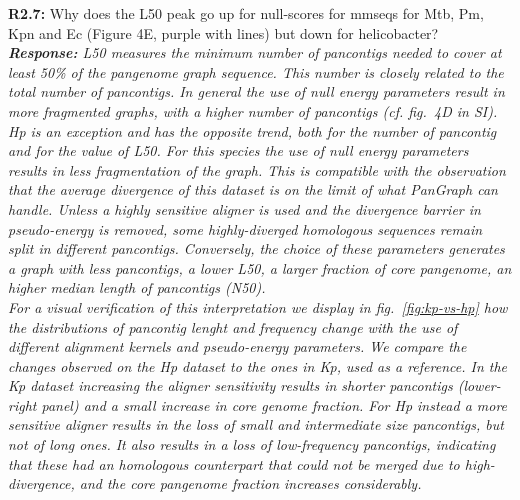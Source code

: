 \documentclass[aps,rmp,onecolumn]{revtex4-1}
\newcommand{\Marco}[1]{{\color{gray}Marco: #1}}
\newcommand{\Liam}[1]{{\color{teal}Liam: #1}}
\newcommand{\reviewer}[2]{\textbf{#1:} #2\vskip 5mm}
\newcommand{\response}[1]{{\it {\color{response}\textbf{Response:} #1}}\vskip 5mm}
\begin{document}
\reviewer{R2.7}{Why does the L50 peak go up for null-scores for mmseqs for Mtb, Pm, Kpn and Ec (Figure 4E, purple with lines) but down for helicobacter?}
\response{L50 measures the minimum number of pancontigs needed to cover at least 50\% of the pangenome graph sequence. This number is closely related to the total number of pancontigs. In general the use of null energy parameters result in more fragmented graphs, with a higher number of pancontigs (cf. fig.~4D in SI). Hp is an exception and has the opposite trend, both for the number of pancontig and for the value of L50. For this species the use of null energy parameters results in less fragmentation of the graph. This is compatible with the observation that the average divergence of this dataset is on the limit of what PanGraph can handle. Unless a highly sensitive aligner is used and the divergence barrier in pseudo-energy is removed, some highly-diverged homologous sequences remain split in different pancontigs. Conversely, the choice of these parameters generates a graph with less pancontigs, a lower L50, a larger fraction of core pangenome, an higher median length of pancontigs (N50).\\
      For a visual verification of this interpretation we display in fig.~\ref{fig:kp-vs-hp} how the distributions of pancontig lenght and frequency change with the use of different alignment kernels and pseudo-energy parameters. We compare the changes observed on the Hp dataset to the ones in Kp, used as a reference. In the Kp dataset increasing the aligner sensitivity results in shorter pancontigs (lower-right panel) and a small increase in core genome fraction. For Hp instead a more sensitive aligner results in the loss of small and intermediate size pancontigs, but not of long ones. It also results in a loss of low-frequency pancontigs, indicating that these had an homologous counterpart that could not be merged due to high-divergence, and the core pangenome fraction increases considerably.
}
\end{document}

